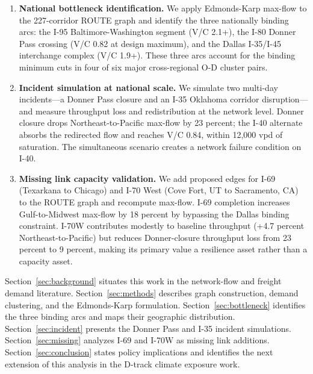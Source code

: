 \begin{enumerate}
  \item \textbf{National bottleneck identification.} We apply Edmonds-Karp max-flow to the 227-corridor ROUTE graph and identify the three nationally binding arcs: the I-95 Baltimore-Washington segment (V/C 2.1+), the I-80 Donner Pass crossing (V/C 0.82 at design maximum), and the Dallas I-35/I-45 interchange complex (V/C 1.9+). These three arcs account for the binding minimum cuts in four of six major cross-regional O-D cluster pairs.

  \item \textbf{Incident simulation at national scale.} We simulate two multi-day incidents---a Donner Pass closure and an I-35 Oklahoma corridor disruption---and measure throughput loss and redistribution at the network level. Donner closure drops Northeast-to-Pacific max-flow by 23 percent; the I-40 alternate absorbs the redirected flow and reaches V/C 0.84, within 12,000 vpd of saturation. The simultaneous scenario creates a network failure condition on I-40.

  \item \textbf{Missing link capacity validation.} We add proposed edges for I-69 (Texarkana to Chicago) and I-70 West (Cove Fort, UT to Sacramento, CA) to the ROUTE graph and recompute max-flow. I-69 completion increases Gulf-to-Midwest max-flow by 18 percent by bypassing the Dallas binding constraint. I-70W contributes modestly to baseline throughput (+4.7 percent Northeast-to-Pacific) but reduces Donner-closure throughput loss from 23 percent to 9 percent, making its primary value a resilience asset rather than a capacity asset.
\end{enumerate}

Section~\ref{sec:background} situates this work in the network-flow and freight demand literature. Section~\ref{sec:methods} describes graph construction, demand clustering, and the Edmonds-Karp formulation. Section~\ref{sec:bottleneck} identifies the three binding arcs and maps their geographic distribution. Section~\ref{sec:incident} presents the Donner Pass and I-35 incident simulations. Section~\ref{sec:missing} analyzes I-69 and I-70W as missing link additions. Section~\ref{sec:conclusion} states policy implications and identifies the next extension of this analysis in the D-track climate exposure work.

